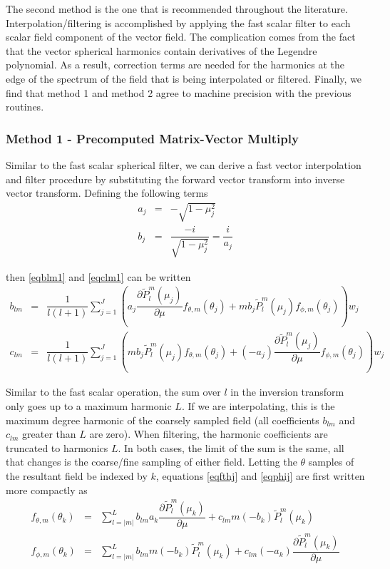 The second method is the one that is recommended throughout the literature. Interpolation/filtering is accomplished by applying the fast scalar filter to each scalar field component of the vector field. The complication comes from the fact that the vector spherical harmonics contain derivatives of the Legendre polynomial. As a result, correction terms are needed for the harmonics at the edge of the spectrum of the field that is being interpolated or filtered. Finally, we find that method 1 and method 2 agree to machine precision with the previous routines. 

\subsubsection{Method 1 - Precomputed Matrix-Vector Multiply}
Similar to the fast scalar spherical filter, we can derive a fast vector interpolation and filter procedure by substituting the forward vector transform into inverse vector transform.  Defining the following terms \begin{eqnarray}
a_j &=& -\sqrt{1-\mu_j^2} \\
b_j &=& \dfrac{-i}{\sqrt{1-\mu_j^2}} = \dfrac{i}{a_j} 
\end{eqnarray}

then \eqref{eqblm1} and \eqref{eqclm1} can be written
\begin{eqnarray}
b_{lm} &=& \dfrac{1}{l(l+1)}\sum_{j=1}^J \left( a_j\dfrac{\partial \widetilde{P}_l^m(\mu_j)}{\partial\mu}f_{\theta,m}(\theta_j)   + m b_j \widetilde{P}_l^m(\mu_j) f_{\phi,m}(\theta_j)  \right) w_j  \label{meth11} \\
c_{lm} &=& \dfrac{1}{l(l+1)}\sum_{j=1}^J \left( m b_j\widetilde{P}_l^m(\mu_j) f_{\theta,m}(\theta_j)   +  (-a_j)\dfrac{\partial \widetilde{P}_l^m(\mu_j)}{\partial\mu} f_{\phi,m}(\theta_j)  \right) w_j \label{meth12}
\end{eqnarray}

Similar to the fast scalar operation, the sum over $l$ in the inversion transform only goes up to a maximum harmonic $L$.  If we are interpolating, this is the maximum degree harmonic of the coarsely sampled field (all coefficients $b_{lm}$ and $c_{lm}$ greater than $L$ are zero).  When filtering, the harmonic coefficients are truncated to harmonics $L$. In both cases, the limit of the sum is the same, all that changes is the coarse/fine sampling of either field. Letting the $\theta$ samples of the resultant field be indexed by $k$, equations \eqref{eqfthj} and \eqref{eqphij} are first written more compactly as 
\begin{eqnarray}
f_{\theta,m}(\theta_k) &=& \sum_{l=\vert m \vert }^L b_{lm} a_k \dfrac{\partial \widetilde{P}_l^m(\mu_k)}{\partial\mu} + c_{lm}  m(-b_k) \widetilde{P}_l^m(\mu_k) \label{fvsfiltf1} \\
f_{\phi,m}(\theta_k) &=& \sum_{l=\vert m \vert }^L b_{lm}  m(-b_k) \widetilde{P}_l^m(\mu_k) + c_{lm}(-a_k)\dfrac{\partial \widetilde{P}_l^m(\mu_k)}{\partial\mu} \label{fvsfiltf2}
\end{eqnarray}

